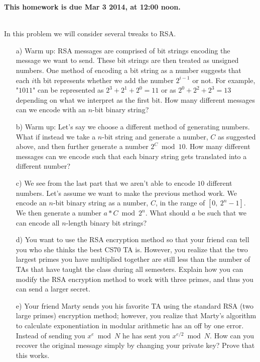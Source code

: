 \documentclass[]{article}
\begin{document}
\maketitle
{}
\vspace{0.5em}
{\Large{\textbf{This homework is due Mar 3 2014, at 12:00 noon.}}}

\begin{qunlist}
  
\\    %
In this problem we will consider several tweaks to RSA.
\begin{itemize}
\qpart
\item [a)] Warm up: RSA messages are comprised of bit strings encoding the message we want to send. These bit strings are then treated as unsigned numbers. One method of encoding a bit string as a number suggests that each $i$th bit represents whether we add the number $2^{i-1}$ or not. For example, "$1011$" can be represented as $2^3 + 2^1 + 2^0 = 11$ or as $2^0 + 2^2 + 2^3 = 13$ depending on what we interpret as the first bit. How many different messages can we encode with an $n$-bit binary string?
\qpart
\item [b)] Warm up: Let's say we choose a different method of generating numbers. What if instead we take a $n$-bit string and generate a number, $C$ as suggested above, and then further generate a number $2^C \bmod 10$. How many different messages can we encode such that each binary string gets translated into a different number?
\qpart
\item [c)] We see from the last part that we aren't able to encode $10$ different numbers. Let's assume we want to make the previous method work. We encode an $n$-bit binary string as a number, $C$, in the range of $[0, \ 2^n -1]$. We then generate a number $a*C \bmod {2^n}$. What should $a$ be such that we can encode all $n$-length binary bit strings?
\qpart
\item [d)] You want to use the RSA encryption method so that your friend can tell you who she thinks the best CS70 TA is. However, you realize that the two largest primes you have multiplied together are still less than the number of TAs that have taught the class during all semesters. Explain how you can modify the RSA encryption method to work with three primes, and thus you can send a larger secret.
\qpart
\item [e)] Your friend Marty sends you his favorite TA using the standard RSA (two large primes) encryption method; however, you realize that Marty's algorithm to calculate exponentiation in modular arithmetic has an off by one error. Instead of sending you $x^e \bmod{N}$ he has sent you $x^{e/2} \bmod{N}$. How can you recover the original message simply by changing your private key? Prove that this works.
\end{itemize}



\end{qunlist}
\end{document}
